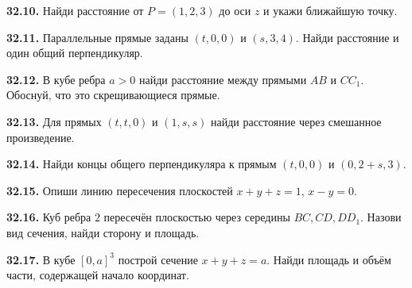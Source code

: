 \noindent\begin{minipage}[t]{\linewidth}\textbf{32.10.} Найди расстояние от \(P=(1,2,3)\) до оси \(z\) и укажи ближайшую точку.\par\end{minipage}\par
\noindent\begin{minipage}[t]{\linewidth}\textbf{32.11.} Параллельные прямые заданы \((t,0,0)\) и \((s,3,4)\). Найди расстояние и один общий перпендикуляр.\par\end{minipage}\par
\noindent\begin{minipage}[t]{\linewidth}\textbf{32.12.} В кубе ребра \(a>0\) найди расстояние между прямыми \(AB\) и \(CC_1\). Обоснуй, что это скрещивающиеся прямые.\par\end{minipage}\par
\noindent\begin{minipage}[t]{\linewidth}\textbf{32.13.} Для прямых \((t,t,0)\) и \((1,s,s)\) найди расстояние через смешанное произведение.\par\end{minipage}\par
\noindent\begin{minipage}[t]{\linewidth}\textbf{32.14.} Найди концы общего перпендикуляра к прямым \((t,0,0)\) и \((0,2+s,3)\).\par\end{minipage}\par
\noindent\begin{minipage}[t]{\linewidth}\textbf{32.15.} Опиши линию пересечения плоскостей \(x+y+z=1\), \(x-y=0\).\par\end{minipage}\par
\noindent\begin{minipage}[t]{\linewidth}\textbf{32.16.} Куб ребра \(2\) пересечён плоскостью через середины \(BC,CD,DD_1\). Назови вид сечения, найди сторону и площадь.\par\end{minipage}\par
\noindent\begin{minipage}[t]{\linewidth}\textbf{32.17.} В кубе \([0,a]^3\) построй сечение \(x+y+z=a\). Найди площадь и объём части, содержащей начало координат.\par\end{minipage}\par
